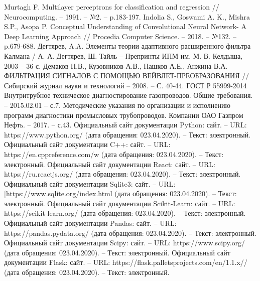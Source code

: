 \documentclass[a4paper,article,14pt]{extarticle}
\begin{document}
\begin{thebibliography}{1}
 Murtagh F. Multilayer perceptrons for classification and regression // Neurocomputing. – 1991. – №2. –  p.183-197.
 Indolia S., Goswami A. K., Mishra S.P., Asopa P. Conceptual Understanding of Convolutional Neural Network- A Deep Learning Approach // Procedia Computer Science. – 2018. – №132. –  p.679-688.
 Дегтярев, A.A. Элементы теории адаптивного расширенного фильтра Калмана / А. А. Дегтярев, Ш. Тайль – Препринты ИПМ им. М. В. Келдыша, 2003 – 36 с.
 Демаков Н.В., Кузовников А.В., Пашков А.Е., Анжина В.А.  ФИЛЬТРАЦИЯ СИГНАЛОВ С ПОМОЩЬЮ ВЕЙВЛЕТ-ПРЕОБРАЗОВАНИЯ // Сибирский журнал науки и технологий – 2008.  – С. 40-44.
 ГОСТ Р 55999-2014 Внутритрубное техническое диагностирование газопроводов. Общие требования. – 2015.02.01 – с.7.
 Методические указания по организации и исполнению программ диагностики промысловых трубопроводов. Компании ОАО  \flqq Газпром Нефть\frqq. – 2017. – с.43.
 Официальный сайт документации Python: сайт. – URL: https://www.python.org/ (дата обращения: 023.04.2020). – Текст: электронный.
 Официальный сайт документации C++: сайт. – URL: https://en.cppreference.com/w (дата обращения: 023.04.2020). – Текст: электронный.
 Официальный сайт документации React: сайт. – URL: https://ru.reactjs.org/ (дата обращения: 023.04.2020). – Текст: электронный.
 Официальный сайт документации Sqlite3: сайт. – URL: [https://www.sqlite.org/index.html (дата обращения: 023.04.2020). – Текст: электронный.
 Официальный сайт документации Scikit-Learn: сайт. – URL: https://scikit-learn.org/ (дата обращения: 023.04.2020). – Текст: электронный.
 Официальный сайт документации Pandas: сайт. – URL: https://pandas.pydata.org/ (дата обращения: 023.04.2020). – Текст: электронный.
 Официальный сайт документации Scipy: сайт. – URL: https://www.scipy.org/ (дата обращения: 023.04.2020). – Текст: электронный.
 Официальный сайт документации Flask: сайт. – URL: https://flask.palletsprojects.com/en/1.1.x// (дата обращения: 023.04.2020). – Текст: электронный.

\end{thebibliography}
\end{document}
